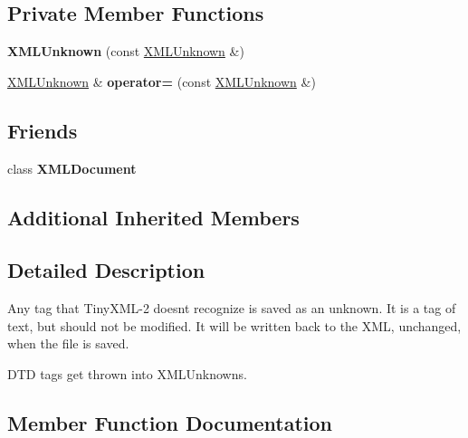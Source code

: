 \subsection*{Private Member Functions}
\begin{DoxyCompactItemize}
\item 
{\bfseries X\+M\+L\+Unknown} (const \hyperlink{classtinyxml2_1_1XMLUnknown}{X\+M\+L\+Unknown} \&)\hypertarget{classtinyxml2_1_1XMLUnknown_aab31a93c95a7cedc9597cea7caffa73f}{}\label{classtinyxml2_1_1XMLUnknown_aab31a93c95a7cedc9597cea7caffa73f}

\item 
\hyperlink{classtinyxml2_1_1XMLUnknown}{X\+M\+L\+Unknown} \& {\bfseries operator=} (const \hyperlink{classtinyxml2_1_1XMLUnknown}{X\+M\+L\+Unknown} \&)\hypertarget{classtinyxml2_1_1XMLUnknown_a6137d5611db42c35de3d869f66555e5b}{}\label{classtinyxml2_1_1XMLUnknown_a6137d5611db42c35de3d869f66555e5b}

\end{DoxyCompactItemize}
\subsection*{Friends}
\begin{DoxyCompactItemize}
\item 
class {\bfseries X\+M\+L\+Document}\hypertarget{classtinyxml2_1_1XMLUnknown_a4eee3bda60c60a30e4e8cd4ea91c4c6e}{}\label{classtinyxml2_1_1XMLUnknown_a4eee3bda60c60a30e4e8cd4ea91c4c6e}

\end{DoxyCompactItemize}
\subsection*{Additional Inherited Members}


\subsection{Detailed Description}
Any tag that Tiny\+X\+M\+L-\/2 doesn\textquotesingle{}t recognize is saved as an unknown. It is a tag of text, but should not be modified. It will be written back to the X\+ML, unchanged, when the file is saved.

D\+TD tags get thrown into X\+M\+L\+Unknowns. 

\subsection{Member Function Documentation}
